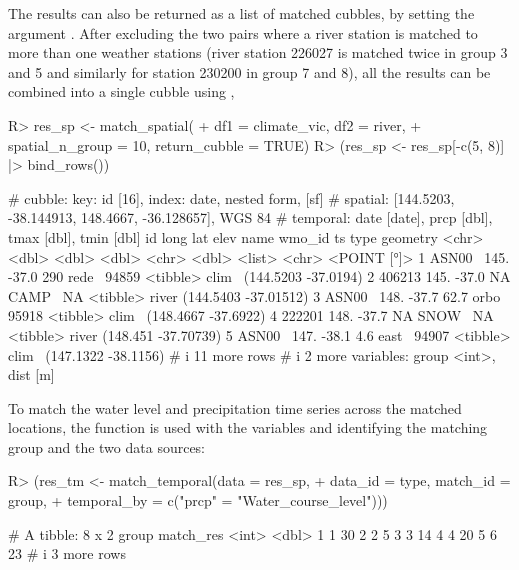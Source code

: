 \documentclass[
  shortnames]{jss}
\begin{document}
The results can also be returned as a list of matched cubbles, by setting the argument . After excluding the two pairs where a river station is matched to more than one weather stations (river station 226027 is matched twice in group 3 and 5 and similarly for station 230200 in group 7 and 8), all the results can be combined into a single cubble using ,

\begin{CodeChunk}
\begin{CodeInput}
R> res_sp <- match_spatial(
+   df1 = climate_vic, df2 = river, 
+   spatial_n_group = 10, return_cubble = TRUE)
R> (res_sp <- res_sp[-c(5, 8)] |> bind_rows())
\end{CodeInput}
\begin{CodeOutput}
# cubble:   key: id [16], index: date, nested form, [sf]
# spatial:  [144.5203, -38.144913, 148.4667, -36.128657], WGS 84
# temporal: date [date], prcp [dbl], tmax [dbl], tmin [dbl]
  id      long   lat  elev name  wmo_id ts       type              geometry
  <chr>  <dbl> <dbl> <dbl> <chr>  <dbl> <list>   <chr>          <POINT [°]>
1 ASN00~  145. -37.0 290   rede~  94859 <tibble> clim~  (144.5203 -37.0194)
2 406213  145. -37.0  NA   CAMP~     NA <tibble> river (144.5403 -37.01512)
3 ASN00~  148. -37.7  62.7 orbo~  95918 <tibble> clim~  (148.4667 -37.6922)
4 222201  148. -37.7  NA   SNOW~     NA <tibble> river  (148.451 -37.70739)
5 ASN00~  147. -38.1   4.6 east~  94907 <tibble> clim~  (147.1322 -38.1156)
# i 11 more rows
# i 2 more variables: group <int>, dist [m]
\end{CodeOutput}
\end{CodeChunk}

To match the water level and precipitation time series across the matched locations, the function  is used with the variables  and  identifying the matching group and the two data sources:

\begin{CodeChunk}
\begin{CodeInput}
R> (res_tm <- match_temporal(data = res_sp,
+                           data_id = type, match_id = group,
+                           temporal_by = c("prcp" = "Water_course_level")))
\end{CodeInput}
\begin{CodeOutput}
# A tibble: 8 x 2
  group match_res
  <int>     <dbl>
1     1        30
2     2         5
3     3        14
4     4        20
5     6        23
# i 3 more rows
\end{CodeOutput}
\end{CodeChunk}
\end{document}
